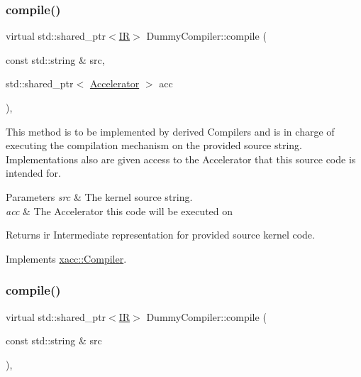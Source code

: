 \subsubsection{\texorpdfstring{compile()}{compile()}\hspace{0.1cm}{\footnotesize\ttfamily [1/2]}}
{\footnotesize\ttfamily virtual std\+::shared\+\_\+ptr$<$\hyperlink{a01148}{IR}$>$ Dummy\+Compiler\+::compile (\begin{DoxyParamCaption}\item[{const std\+::string \&}]{src,  }\item[{std\+::shared\+\_\+ptr$<$ \hyperlink{a01084}{Accelerator} $>$}]{acc }\end{DoxyParamCaption})\hspace{0.3cm}{\ttfamily [inline]}, {\ttfamily [virtual]}}

This method is to be implemented by derived Compilers and is in charge of executing the compilation mechanism on the provided source string. Implementations also are given access to the Accelerator that this source code is intended for.


\begin{DoxyParams}{Parameters}
{\em src} & The kernel source string. \\
\hline
{\em acc} & The Accelerator this code will be executed on \\
\hline
\end{DoxyParams}
\begin{DoxyReturn}{Returns}
ir Intermediate representation for provided source kernel code. 
\end{DoxyReturn}


Implements \hyperlink{a01100_a546a40c95bb93af6a0c0ac48dbeaffc8}{xacc\+::\+Compiler}.

\mbox{\label{a00972_a2f9bb3d30bb11f12b530854a11c8fb25}} 
\subsubsection{\texorpdfstring{compile()}{compile()}\hspace{0.1cm}{\footnotesize\ttfamily [2/2]}}
{\footnotesize\ttfamily virtual std\+::shared\+\_\+ptr$<$\hyperlink{a01148}{IR}$>$ Dummy\+Compiler\+::compile (\begin{DoxyParamCaption}\item[{const std\+::string \&}]{src }\end{DoxyParamCaption})\hspace{0.3cm}{\ttfamily [inline]}, {\ttfamily [virtual]}}


